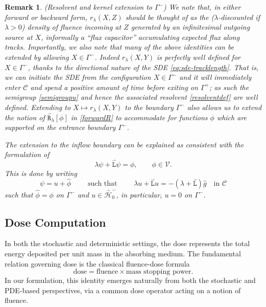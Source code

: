 \documentclass{amsart}
\newcommand{\fL}{\stackrel{_\rightarrow}{\mathtt L}}
\newcommand{\fR}{\stackrel{_\rightarrow}{\mathtt R}}
\theoremstyle{plain}
\newtheorem{remark}[theorem]{Remark}
\newcommand{\cH}{\stackrel{_\rightarrow}{\mathscr H}}
\newcommand{\cV}{\ensuremath{\mathscr V}}
\begin{document}
\begin{remark}(Resolvent and kernel extension to $\Gamma^-$)
  \rm\label{extend} We note that, in either forward or backward form,
  $r_\lambda(X,Z)$ should be thought of as the ($\lambda$-discounted
  if $\lambda>0$) density of fluence incoming at $Z$ generated by an
  infinitesimal outgoing source at $X$, informally a ``flux
  capacitor'' accumulating expected flux along tracks. Importantly, we
  also note that many of the above identities can be extended by
  allowing $X\in \Gamma^-$. Indeed $r_\lambda(X,Y)$ is perfectly well
  defined for $X\in \Gamma^-$, thanks to the directional nature of the
  SDE \eqref{eq:sde-tracklength}.  That is, we can initiate the SDE
  from the configuration $X\in \Gamma^-$ and it will immediately enter
  $\mathcal{C}$ and spend a positive amount of time before exiting on
  $\Gamma^+$; as such the semigroup \eqref{semigroupu} and hence the
  associated resolvent \eqref{resolventdef} are well
  defined. Extending to $X\mapsto r_\lambda(X,Y)$ to the boundary
  $\Gamma^-$ also allows us to extend the notion of
  $\fR_\lambda[\phi]$ in \eqref{forwardR} to accommodate for functions
  $\phi$ which are supported on the entrance boundary $\Gamma^-$.

The extension to the inflow boundary can be explained as consistent
with the formulation of
\begin{equation}
  \lambda \psi + \fL \psi = \phi, \qquad \phi \in \cV.
\end{equation}
This is done by writing
\begin{equation}
  \psi = u + \widehat{\phi}\qquad \text{ such that } \qquad \lambda  u+ \fL u = - (\lambda + \fL) \widehat{g} \quad \text{in } \mathcal{C} 
\end{equation}
such that $\widehat{\phi} = \phi$ on $\Gamma^-$ and $u\in \cH_0^-$, in
particular, $u = 0$ on $\Gamma^-$.
\end{remark}


 
\subsection*{Dose Computation}

In both the stochastic and deterministic settings, the dose represents
the total energy deposited per unit mass in the absorbing medium. The
fundamental relation governing dose is the classical fluence-dose
formula
\begin{equation}
  \label{textbookdose}
  \text{dose} = \text{fluence} \times \text{mass stopping power}.
\end{equation}
In our formulation, this identity emerges naturally from both the
stochastic and PDE-based perspectives, via a common dose operator
acting on a notion of fluence.
\end{document}
